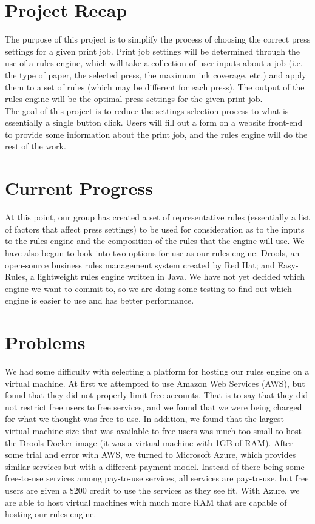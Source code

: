 \documentclass[onecolumn, draftclsnofoot,10pt, compsoc]{IEEEtran}
\begin{document}
\singlespacing

\section{Project Recap}
The purpose of this project is to simplify the process of choosing the correct press settings for a given print job. Print job settings will be determined through the use of a rules engine, which will take a collection of user inputs about a job (i.e. the type of paper, the selected press, the maximum ink coverage, etc.) and apply them to a set of rules (which may be different for each press). The output of the rules engine will be the optimal press settings for the given print job.\\[10pt]
The goal of this project is to reduce the settings selection process to what is essentially a single button click. Users will fill out a form on a website front-end to provide some information about the print job, and the rules engine will do the rest of the work.

\section{Current Progress}
At this point, our group has created a set of representative rules (essentially a list of factors that affect press settings) to be used for consideration as to the inputs to the rules engine and the composition of the rules that the engine will use. We have also begun to look into two options for use as our rules engine: Drools, an open-source business rules management system created by Red Hat; and Easy-Rules, a lightweight rules engine written in Java. We have not yet decided which engine we want to commit to, so we are doing some testing to find out which engine is easier to use and has better performance.

\section{Problems}
We had some difficulty with selecting a platform for hosting our rules engine on a virtual machine. At first we attempted to use Amazon Web Services (AWS), but found that they did not properly limit free accounts. That is to say that they did not restrict free users to free services, and we found that we were being charged for what we thought was free-to-use. In addition, we found that the largest virtual machine size that was available to free users was much too small to host the Drools Docker image (it was a virtual machine with 1GB of RAM). After some trial and error with AWS, we turned to Microsoft Azure, which provides similar services but with a different payment model. Instead of there being some free-to-use services among pay-to-use services, all services are pay-to-use, but free users are given a \$200 credit to use the services as they see fit. With Azure, we are able to host virtual machines with much more RAM that are capable of hosting our rules engine.
\end{document}
